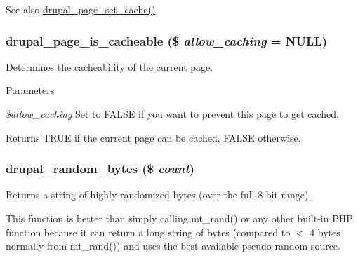 \begin{DoxySeeAlso}{See also}
\hyperlink{common_8inc_ac46363381db03a8d6a2663d031d8ce07}{drupal\_\-page\_\-set\_\-cache()} 
\end{DoxySeeAlso}
\hypertarget{bootstrap_8inc_a7972b6ea362a180e975d1d531a18996a}{
\subsubsection[{drupal\_\-page\_\-is\_\-cacheable}]{\setlength{\rightskip}{0pt plus 5cm}drupal\_\-page\_\-is\_\-cacheable (\$ {\em allow\_\-caching} = {\ttfamily NULL})}}
\label{bootstrap_8inc_a7972b6ea362a180e975d1d531a18996a}
Determines the cacheability of the current page.


\begin{DoxyParams}{Parameters}
\item[{\em \$allow\_\-caching}]Set to FALSE if you want to prevent this page to get cached.\end{DoxyParams}
\begin{DoxyReturn}{Returns}
TRUE if the current page can be cached, FALSE otherwise. 
\end{DoxyReturn}
\hypertarget{bootstrap_8inc_a6eb7796c83ea744f818faa2a02f19953}{
\subsubsection[{drupal\_\-random\_\-bytes}]{\setlength{\rightskip}{0pt plus 5cm}drupal\_\-random\_\-bytes (\$ {\em count})}}
\label{bootstrap_8inc_a6eb7796c83ea744f818faa2a02f19953}
Returns a string of highly randomized bytes (over the full 8-\/bit range).

This function is better than simply calling mt\_\-rand() or any other built-\/in PHP function because it can return a long string of bytes (compared to $<$ 4 bytes normally from mt\_\-rand()) and uses the best available pseudo-\/random source.


